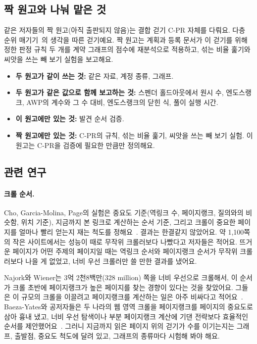 \subsection{짝 원고와 나눠 맡은 것}

같은 저자들의 짝 원고(아직 출판되지 않음)는 결합 걷기 C-PR 자체를 다뤄요. 다층 순위 매기기~\cite{halu2013multiplex,dedomenico2015ranking}의 생각을 따른 걷기예요. 짝 원고는 계획과 등록 문서가 이 걷기를 위해 정한 판정 규칙 두 개를 계약 그래프의 점수에 재분석으로 적용하고, 섞는 비율 훑기와 씨앗을 쓰는 빼 보기 실험을 보고해요.

\begin{itemize}
\item \textbf{두 원고가 같이 쓰는 것:} 같은 자료, 계정 종류, 그래프.
\item \textbf{두 원고가 같은 값으로 함께 보고하는 것:} 스펜더 홀드아웃에서 원시 수, 엔도스랭크, AWP의 계수와 그 수 대비, 엔도스랭크의 닫힌 식, 풀이 실행 시간.
\item \textbf{이 원고에만 있는 것:} 발견 순서 검증.
\item \textbf{짝 원고에만 있는 것:} C-PR의 규칙, 섞는 비율 훑기, 씨앗을 쓰는 빼 보기 실험. 이 원고는 C-PR을 검증에 필요한 만큼만 정의해요.
\end{itemize}

\subsection{관련 연구}

\paragraph{크롤 순서.}
Cho, Garcia-Molina, Page의 실험은 중요도 기준(역링크 수, 페이지랭크, 질의와의 비슷함, 위치 기준), 지금까지 본 링크로 계산하는 순서 기준, 그리고 크롤이 중요한 페이지를 얼마나 빨리 얻는지 재는 척도를 정해요~\cite{cho1998crawling}. 결과는 한결같지 않았어요. 약 1,100쪽의 작은 사이트에서는 성능이 때로 무작위 크롤러보다 나빴다고 저자들은 적어요. 뜨거운 페이지가 어떤 주제의 페이지일 때는 역링크 순서와 페이지랭크 순서가 무작위 크롤러보다 나을 게 없었고, 너비 우선 크롤러만 쓸 만한 결과를 냈어요.

Najork와 Wiener는 3억 2천8백만(328 million) 쪽을 너비 우선으로 크롤해서, 이 순서가 크롤 초반에 페이지랭크가 높은 페이지를 찾는 경향이 있다는 것을 찾았어요. 그들은 이 규모의 크롤을 이끌려고 페이지랭크를 계산하는 일은 아주 비싸다고 적어요~\cite{najork2001breadth}. Baeza-Yates와 공저자들은 두 나라의 웹 영역 크롤을 페이지랭크를 페이지의 중요도로 삼아 흉내 냈고, 너비 우선 탐색이나 부분 페이지랭크 계산에 기댄 전략보다 효율적인 순서를 제안했어요~\cite{baezayates2005crawling}. 그러니 지금까지 읽은 페이지 위의 걷기가 수를 이기는지는 그래프, 출발점, 중요도 척도에 달려 있고, 그래프의 종류마다 시험해 봐야 해요.

